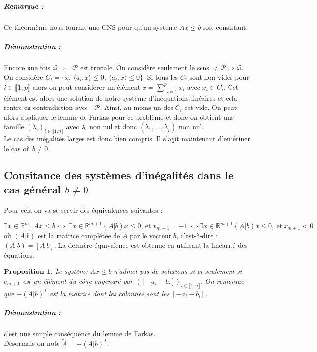 \documentclass[10pt,a4paper]{article}
\newtheorem{thm}{Théorème}
\newtheorem{prop}{Proposition}
\begin{document}
\subparagraph{Remarque :}
  Ce théormème nous fournit une CNS pour qu'un systeme $Ax \leq b$ soit consistant.

\subparagraph{Démonstration :}
  Encore une fois $\mathcal{Q} \Rightarrow \neg \mathcal{P}$ est triviale.
  On considère seulement le sens $\neq \mathcal{P} \Rightarrow \mathcal{Q}$.
  On considère $C_i=\lbrace
  x, \ \langle a_i,x \rangle \le 0, \ \langle a_j,x \rangle \le 0\rbrace$.
  Si tous les $C_i$ sont non vides pour $i \in \llbracket 1,p \rrbracket$ alors on peut considérer un élément $x=\underset{i=1}{\overset{p}{\sum}}x_i$ avec $x_i \in C_i$.
  Cet élément est alors une solution de notre système d'inéquations linéaires et cela rentre en contradiction avec $\neg \mathcal{P}$.
  Ainsi, au moins un des $C_i$ est vide.
  On peut alors appliquer le lemme de Farkas pour ce problème et donc on obtient une famille $(\lambda_i)_{i \in \llbracket 1,n \rrbracket}$ avec $\lambda_i$ non nul et donc $(\lambda_1, \dots, \lambda_p)$ non nul.
  \\


Le cas des inégalités larges est donc bien compris.
Il s'agit maintenant d'entériner le cas où $b \neq 0$.

\subsection{Consitance des systèmes d'inégalités dans le cas général $b \neq 0$}

Pour cela on va se servir des équivalences suivantes :

\begin{equation}
\exists x \in \mathbb{R}^m, \ Ax \le b \ \Leftrightarrow \ \exists x \in \mathbb{R}^{m+1}(A\vert b)x\le 0, \ \text{et} \ x_{m+1}=-1 \ \Leftrightarrow \exists x \in \mathbb{R}^{m+1}(A\vert b)x\le 0, \ \text{et} \ x_{m+1}<0
\end{equation}
où $(A \vert b)$ est la matrice complétée de $A$ par le vecteur $b$, c'est-à-dire : $(A\vert b)= [A \ b ]$.
La dernière équivalence est obtenue en utilisant la linéarité des équations.

\begin{prop}
Le système $Ax \le b$ n'admet pas de solutions si et seulement si $e_{m+1}$ est un élément du cône engendré par  $([-a_i -b_i])_{i \in \llbracket 1,n \rrbracket}$.
On remarque que $-(A \vert b)^T$ est la matrice dont les colonnes sont les $[-a_i -b_i]$.
\end{prop}
\subparagraph{Démonstration :} c'est une simple conséquence du lemme de Farkas.\\
Désormais on note $\tilde{A}=-(A \vert b)^T$.
\end{document}
